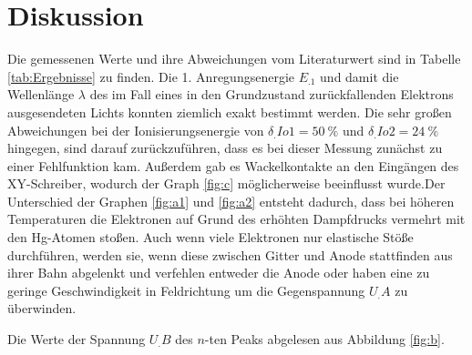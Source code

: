 
\section{Diskussion}
\label{sec:Diskussion}

Die gemessenen Werte und ihre Abweichungen vom Literaturwert sind in Tabelle \ref{tab:Ergebnisse} zu finden.
Die 1. Anregungsenergie $E_.1$ und damit die Wellenlänge $\lambda$ des im Fall eines in den Grundzustand zurückfallenden Elektrons ausgesendeten Lichts konnten ziemlich exakt bestimmt werden.\newline
Die sehr großen Abweichungen bei der Ionisierungsenergie von $\delta_.{Io1}=\SI{50}{\percent}$ und $\delta_.{Io2}=\SI{24}{\percent}$ hingegen, sind darauf zurückzuführen, dass es bei dieser Messung zunächst zu einer Fehlfunktion kam. Außerdem gab es Wackelkontakte an den Eingängen des XY-Schreiber, wodurch der Graph \ref{fig:c} möglicherweise beeinflusst wurde.\newline Der Unterschied der Graphen \ref{fig:a1} und \ref{fig:a2} entsteht dadurch, dass bei höheren Temperaturen die Elektronen auf Grund des erhöhten Dampfdrucks vermehrt mit den Hg-Atomen stoßen. Auch wenn viele Elektronen nur elastische Stöße durchführen, werden sie, wenn diese zwischen Gitter und Anode stattfinden aus ihrer Bahn abgelenkt und verfehlen entweder die Anode oder haben eine zu geringe Geschwindigkeit in Feldrichtung um die Gegenspannung $U_.A$ zu überwinden.
\begin{table}
\centering
\caption{Die Werte der Spannung $U_.B$ des $n$-ten Peaks abgelesen aus Abbildung \ref{fig:b}.}

\end{table}
